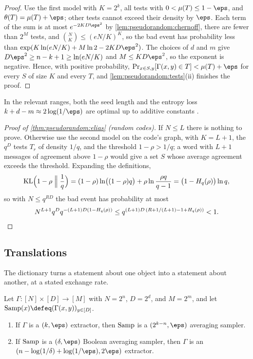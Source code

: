 \begin{refsection}
\begin{proof}
Use the first model with $K=2^k$, all tests with $0<\mu(T)\le1-\eps$, and $\theta(T)=\mu(T)+\eps$; other tests cannot exceed their density by $\eps$. Each term of the sum is at most $e^{-2KD\eps^2}$ by \cref{lem:pseudorandom:chernoff}, there are fewer than $2^M$ tests, and $\binom NK\le(eN/K)^K$, so the bad event has probability less than $\exp(K\ln(eN/K)+M\ln2-2KD\eps^2)$. The choices of $d$ and $m$ give $D\eps^2\ge n-k+1\ge\ln(eN/K)$ and $M\le KD\eps^2$, so the exponent is negative. Hence, with positive probability, $\Pr_{x\in S,y}[\Gamma(x,y)\in T]<\mu(T)+\eps$ for every $S$ of size $K$ and every $T$, and \cref{lem:pseudorandom:tests}(ii) finishes the proof.
\end{proof}

In the relevant ranges, both the seed length and the entropy loss $k+d-m\approx2\log(1/\eps)$ are optimal up to additive constants \parencite{RadhakrishnanTaShma2000}.

\begin{proof}[Proof of \cref{thm:pseudorandom:elias} (random codes)]
If $N\le L$ there is nothing to prove. Otherwise use the second model on the code's graph, with $K=L+1$, the $q^D$ tests $T_r$ of density $1/q$, and the threshold $1-\rho>1/q$; a word with $L+1$ messages of agreement above $1-\rho$ would give a set $S$ whose average agreement exceeds the threshold. Expanding the definitions,
\[
  \operatorname{KL}\Bigl(1-\rho\Bigm\Vert\frac1q\Bigr)=(1-\rho)\ln\bigl((1-\rho)q\bigr)+\rho\ln\frac{\rho q}{q-1}=\bigl(1-H_q(\rho)\bigr)\ln q,
\]
so with $N\le q^{RD}$ the bad event has probability at most
\[
  N^{L+1}q^Dq^{-(L+1)D(1-H_q(\rho))}\le q^{(L+1)D\,(R+1/(L+1)-1+H_q(\rho))}<1.\qedhere
\]
\end{proof}

\subsection{Translations}\label{sec:pseudorandom:translations}

The dictionary turns a statement about one object into a statement about another, at a stated exchange rate.

\begin{theorem}\label{thm:pseudorandom:zuckerman}
Let $\Gamma\colon[N]\times[D]\to[M]$ with $N=2^n$, $D=2^d$, and $M=2^m$, and let $\pseudorandomSamp(x)\defeq(\Gamma(x,y))_{y\in[D]}$.
\begin{enumerate}
\item If $\Gamma$ is a $(k,\eps)$ extractor, then $\operatorname{Samp}$ is a $(2^{k-n},\eps)$ averaging sampler.
\item If $\operatorname{Samp}$ is a $(\delta,\eps)$ Boolean averaging sampler, then $\Gamma$ is an $(n-\log(1/\delta)+\log(1/\eps),2\eps)$ extractor.
\end{enumerate}
\end{theorem}


\end{refsection}
